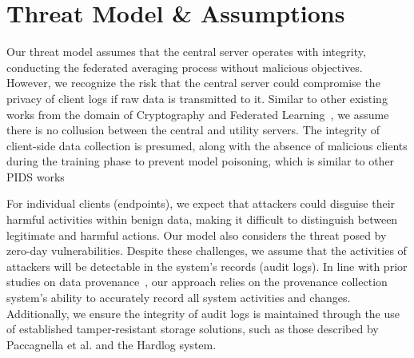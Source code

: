 
\section{Threat Model \& Assumptions}

Our threat model assumes that the central server operates with integrity, conducting the federated averaging process without malicious objectives.  However, we recognize the risk that the central server could compromise the privacy of client logs if raw data is transmitted to it. Similar to other existing works from the domain of Cryptography and Federated Learning~\cite{roy2020crypte,wu2022federated},  we assume there is no collusion between the central and utility servers. The integrity of client-side data collection is presumed, along with the absence of malicious clients during the training phase to prevent model poisoning, which is similar to other PIDS works~\cite{cheng2023kairos,flash2024,yangprographer,wang2022threatrace,provdetector2020}

For individual clients (endpoints), we expect that attackers could disguise their harmful activities within benign data, making it difficult to distinguish between legitimate and harmful actions. Our model also considers the threat posed by zero-day vulnerabilities. Despite these challenges, we assume that the activities of attackers will be detectable in the system's records (audit logs). In line with prior studies on data provenance~\cite{nodoze2019, priotracker2018, mzx2016, bates2017transparent,omegalog,rapsheet2020,provthings2018,dossier,inam2023sok,poirot2019}, our approach relies on the provenance collection system's ability to accurately record all system activities and changes. Additionally, we ensure the integrity of audit logs is maintained through the use of established tamper-resistant storage solutions, such as those described by Paccagnella et al.\cite{paccagnella2020custos} and the Hardlog system\cite{hardlog}.